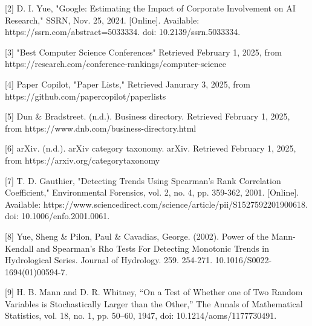\documentclass{article}
\begin{document}
[2] D. I. Yue, "Google: Estimating the Impact of Corporate Involvement on AI Research," SSRN, Nov. 25, 2024. [Online]. Available: https://ssrn.com/abstract=5033334. doi: 10.2139/ssrn.5033334.

[3] "Best Computer Science Conferences" Retrieved February 1, 2025, from https://research.com/conference-rankings/computer-science

[4] Paper Copilot, "Paper Lists," Retrieved Janurary 3, 2025, from https://github.com/papercopilot/paperlists

[5] Dun \& Bradstreet. (n.d.). Business directory. Retrieved February 1, 2025, from https://www.dnb.com/business-directory.html

[6] arXiv. (n.d.). arXiv category taxonomy. arXiv. Retrieved February 1, 2025, from https://arxiv.org/category\textunderscore taxonomy

[7] T. D. Gauthier, "Detecting Trends Using Spearman's Rank Correlation Coefficient," Environmental Forensics, vol. 2, no. 4, pp. 359-362, 2001. [Online]. Available: https://www.sciencedirect.com/science/article/pii/S1527592201900618. doi: 10.1006/enfo.2001.0061.

[8] Yue, Sheng \& Pilon, Paul \& Cavadias, George. (2002). Power of the Mann-Kendall and Spearman's Rho Tests For Detecting Monotonic Trends in Hydrological Series. Journal of Hydrology. 259. 254-271. 10.1016/S0022-1694(01)00594-7. 

[9] H. B. Mann and D. R. Whitney, “On a Test of Whether one of Two Random Variables is Stochastically Larger than the Other,” The Annals of Mathematical Statistics, vol. 18, no. 1, pp. 50–60, 1947, doi: 10.1214/aoms/1177730491.
\end{document}

